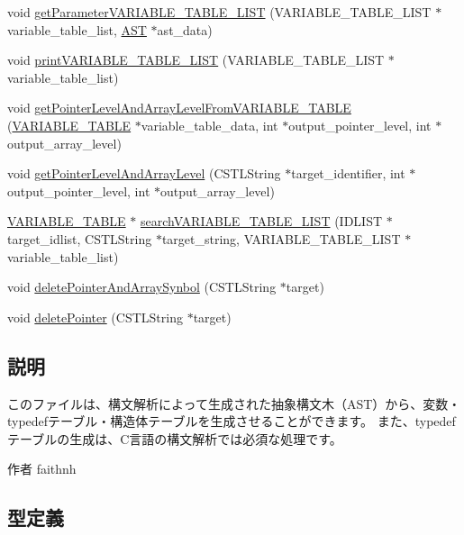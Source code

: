 \begin{DoxyCompactItemize}
\item 
void \hyperlink{Synbol_8h_a823d2eaaec934739c5ff3ebd1843d258}{getParameterVARIABLE\_\-TABLE\_\-LIST} (VARIABLE\_\-TABLE\_\-LIST $\ast$variable\_\-table\_\-list, \hyperlink{structabstract__syntax__tree}{AST} $\ast$ast\_\-data)
\item 
void \hyperlink{Synbol_8h_aa0d5516918a872d6f17450c510482994}{printVARIABLE\_\-TABLE\_\-LIST} (VARIABLE\_\-TABLE\_\-LIST $\ast$variable\_\-table\_\-list)
\item 
void \hyperlink{Synbol_8h_a5b46f7c05dd827544128d6ce0bff2ada}{getPointerLevelAndArrayLevelFromVARIABLE\_\-TABLE} (\hyperlink{structvariable__table}{VARIABLE\_\-TABLE} $\ast$variable\_\-table\_\-data, int $\ast$output\_\-pointer\_\-level, int $\ast$output\_\-array\_\-level)
\item 
void \hyperlink{Synbol_8h_a0c1787648bcdd921d8b6372e90115d34}{getPointerLevelAndArrayLevel} (CSTLString $\ast$target\_\-identifier, int $\ast$output\_\-pointer\_\-level, int $\ast$output\_\-array\_\-level)
\item 
\hyperlink{structvariable__table}{VARIABLE\_\-TABLE} $\ast$ \hyperlink{Synbol_8h_a22dbc5727793ae91c80b9b95f1e06d11}{searchVARIABLE\_\-TABLE\_\-LIST} (IDLIST $\ast$target\_\-idlist, CSTLString $\ast$target\_\-string, VARIABLE\_\-TABLE\_\-LIST $\ast$variable\_\-table\_\-list)
\item 
void \hyperlink{Synbol_8h_acc3cd8275754e5412501748b96b6f23e}{deletePointerAndArraySynbol} (CSTLString $\ast$target)
\item 
void \hyperlink{Synbol_8h_a865793639f2aa40d0c7e5101f130ac3e}{deletePointer} (CSTLString $\ast$target)
\end{DoxyCompactItemize}


\subsection{説明}
このファイルは、構文解析によって生成された抽象構文木（AST）から、変数・typedefテーブル・構造体テーブルを生成させることができます。 また、typedefテーブルの生成は、C言語の構文解析では必須な処理です。 \begin{DoxyAuthor}{作者}
faithnh 
\end{DoxyAuthor}


\subsection{型定義}
